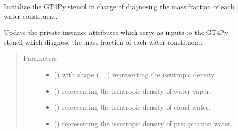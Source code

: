 \documentclass[letterpaper,10pt,english]{sphinxmanual}
\begin{document}
\begin{fulllineitems}
\begin{fulllineitems}
\label{\detokenize{api:dycore.diagnostic_isentropic.DiagnosticIsentropic._stencil_diagnosing_mass_fraction_of_water_constituents_in_air_initialize}}
Initialize the GT4Py stencil in charge of diagnosing the mass fraction of each water constituent.

\end{fulllineitems}


\begin{fulllineitems}
\label{\detokenize{api:dycore.diagnostic_isentropic.DiagnosticIsentropic._stencil_diagnosing_mass_fraction_of_water_constituents_in_air_set_inputs}}
Update the private instance attributes which serve as inputs to the GT4Py stencil which diagnose
the mass fraction of each water constituent.
\begin{quote}\begin{description}
\item[{Parameters}] \leavevmode\begin{itemize}
\item {} 
 () \textendash{}  with shape (, , ) representing the isentropic density.

\item {} 
 () \textendash{}  representing the isentropic density of water vapor.

\item {} 
 () \textendash{}  representing the isentropic density of cloud water.

\item {} 
 () \textendash{}  representing the isentropic density of precipitation water.


\end{itemize}
\end{description}
\end{quote}
\end{fulllineitems}
\end{fulllineitems}
\end{document}
